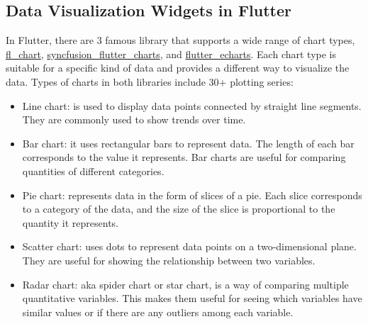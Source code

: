 \begin{multicols}{2}
      \subsection{Data Visualization Widgets in Flutter}
      In Flutter, there are 3 famous library that supports a wide range of chart types,
      \href{https://pub.dev/packages/fl_chart}{fl\_chart},
      \href{https://pub.dev/packages/syncfusion_flutter_charts}{syncfusion\_flutter\_charts}, and
      \href{https://pub.dev/packages/flutter_echarts}{flutter\_echarts}. Each chart type is
      suitable for a specific kind of data and provides a different way to visualize the data. Types of charts in
      both libraries include 30+ plotting series:
      \begin{itemize}
            \item Line chart: is used to display data points connected by straight line segments. They are commonly
                  used to show trends over time.
            \item Bar chart: it uses rectangular bars to represent data. The length of each bar corresponds to the
                  value it represents. Bar charts are useful for comparing quantities of different categories.
            \item Pie chart: represents data in the form of slices of a pie. Each slice corresponds to a category
                  of the data, and the size of the slice is proportional to the quantity it represents.
            \item Scatter chart: uses dots to represent data points on a two-dimensional plane. They are useful
                  for showing the relationship between two variables.
            \item Radar chart: \acrshort{aka} spider chart or star chart, is a way of comparing multiple
                  quantitative variables. This makes them useful for seeing which variables have similar values
                  or if there are any outliers among each variable.
      \end{itemize}
\end{multicols}

